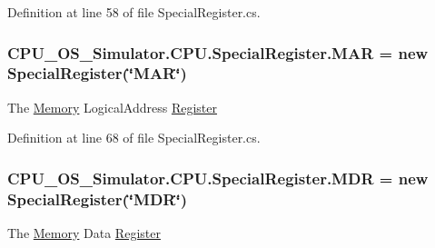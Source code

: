 Definition at line 58 of file Special\+Register.\+cs.

\hypertarget{class_c_p_u___o_s___simulator_1_1_c_p_u_1_1_special_register_a2ae89cee8b74f9985f43ee4e6f994bad}{}
\subsubsection[{M\+A\+R}]{ C\+P\+U\+\_\+\+O\+S\+\_\+\+Simulator.\+C\+P\+U.\+Special\+Register.\+M\+A\+R = new {\bf Special\+Register}(\char`\"{}M\+A\+R\char`\"{})\hspace{0.3cm}{\ttfamily [static]}}\label{class_c_p_u___o_s___simulator_1_1_c_p_u_1_1_special_register_a2ae89cee8b74f9985f43ee4e6f994bad}


The \hyperlink{namespace_c_p_u___o_s___simulator_1_1_memory}{Memory} Logical\+Address \hyperlink{class_c_p_u___o_s___simulator_1_1_c_p_u_1_1_register}{Register} 



Definition at line 68 of file Special\+Register.\+cs.

\hypertarget{class_c_p_u___o_s___simulator_1_1_c_p_u_1_1_special_register_aabf7c761e1f8a9994b7c0b131c53924d}{}
\subsubsection[{M\+D\+R}]{ C\+P\+U\+\_\+\+O\+S\+\_\+\+Simulator.\+C\+P\+U.\+Special\+Register.\+M\+D\+R = new {\bf Special\+Register}(\char`\"{}M\+D\+R\char`\"{})\hspace{0.3cm}{\ttfamily [static]}}\label{class_c_p_u___o_s___simulator_1_1_c_p_u_1_1_special_register_aabf7c761e1f8a9994b7c0b131c53924d}


The \hyperlink{namespace_c_p_u___o_s___simulator_1_1_memory}{Memory} Data \hyperlink{class_c_p_u___o_s___simulator_1_1_c_p_u_1_1_register}{Register} 



